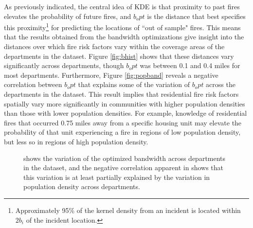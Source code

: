\documentclass{svjour3}
\begin{document}
 As previously indicated, the central idea of KDE is that proximity to past fires elevates the probability of future fires, and $b_opt$ is the distance that best specifies this proximity\footnote{Approximately 95\% of the kernel density from an incident is located within $2b_i$ of the incident location.} for predicting the locations of ``out of sample" fires. This means that the results obtained from the bandwidth optimizations give insight into the distances over which fire risk factors vary within the coverage areas of the departments in the dataset. Figure \ref{fig:bhist} shows that these distances vary significantly across departments, though $b_opt$ was between 0.1 and 0.4 miles for most departments. Furthermore, Figure \ref{fig:popband} reveals a negative correlation between $b_opt$ that explains some of the variation of $b_opt$ across the departments in the dataset. This result implies that residential fire risk factors spatially vary more significantly in communities with higher population densities than those with lower population densities. For example, knowledge of residential fires that occurred 0.75 miles away from a specific housing unit may elevate the probability of that unit experiencing a fire in regions of low population density, but less so in regions of high population density.

\begin{figure}[!ht]
       \begin{center}
      \end{center}
      \caption{\protect{} shows the variation of the optimized bandwidth across departments in the dataset, and the negative correlation apparent in \protect{} shows that this variation is at least partially explained by the variation in population density across departments.}
     \label{fig:band_optimization}
  \end{figure}
  
\end{document}
